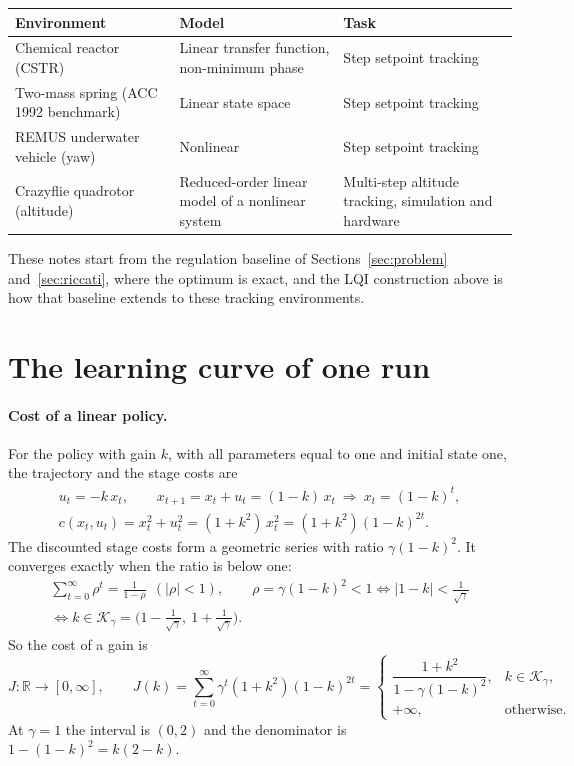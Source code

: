 \documentclass[11pt]{article}
\begin{document}
\begin{center}
  \begin{tabular}{p{} p{} p{}}
    \toprule
    Environment & Model & Task \\
    \midrule
    Chemical reactor (CSTR) & Linear transfer function, non-minimum phase & Step setpoint tracking \\
    Two-mass spring (ACC 1992 benchmark) & Linear state space & Step setpoint tracking \\
    REMUS underwater vehicle (yaw) & Nonlinear & Step setpoint tracking \\
    Crazyflie quadrotor (altitude) & Reduced-order linear model of a nonlinear system
      & Multi-step altitude tracking, simulation and hardware \\
    \bottomrule
  \end{tabular}
\end{center}

These notes start from the regulation baseline of Sections~\ref{sec:problem} and~\ref{sec:riccati},
where the optimum is exact, and the LQI construction above is how that baseline extends to these
tracking environments.

\section{The learning curve of one run}
\label{sec:onerun}

\paragraph{Cost of a linear policy.} For the policy with gain $k$, with all parameters equal to one
and initial state one, the trajectory and the stage costs are
\begin{gather*}
  u_t = -k\, x_t, \qquad x_{t+1} = x_t + u_t = (1 - k)\, x_t \ \Longrightarrow\ x_t = (1 - k)^t, \\
  c(x_t, u_t) = x_t^2 + u_t^2 = (1 + k^2)\, x_t^2 = (1 + k^2)(1 - k)^{2t}.
\end{gather*}
The discounted stage costs form a geometric series with ratio $\gamma(1 - k)^2$. It converges exactly
when the ratio is below one:
\begin{gather*}
  \sum_{t=0}^{\infty} \rho^t = \frac{1}{1 - \rho} \ \ (|\rho| < 1), \qquad
  \rho = \gamma (1 - k)^2 < 1 \iff |1 - k| < \frac{1}{\sqrt{\gamma}} \\
  \iff k \in \mathcal{K}_\gamma = \Big(1 - \frac{1}{\sqrt{\gamma}},\ 1 + \frac{1}{\sqrt{\gamma}}\Big).
\end{gather*}
So the cost of a gain is
\[
  J : \mathbb{R} \to [0, \infty], \qquad
  J(k) = \sum_{t=0}^{\infty} \gamma^t (1 + k^2)(1 - k)^{2t}
  = \begin{cases} \dfrac{1 + k^2}{1 - \gamma (1 - k)^2}, & k \in \mathcal{K}_\gamma, \\[1ex]
    +\infty, & \text{otherwise.} \end{cases}
\]
At $\gamma = 1$ the interval is $(0, 2)$ and the denominator is $1 - (1 - k)^2 = k(2 - k)$.
\end{document}
